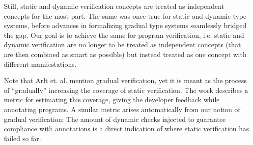 Still, static and dynamic verification concepts are treated as independent concepts for the most part.
The same was once true for static and dynamic type systems, before advances in formalizing gradual type systems seamlessly bridged the gap.
Our goal is to achieve the same for program verification, i.e. static and dynamic verification are no longer to be treated as independent concepts (that are then combined as smart as possible) but instead treated as one concept with different manifestations.

Note that Arlt et. al. \cite{arlt2014gradual} mention gradual verification, yet it is meant as the process of “gradually” increasing the coverage of static verification.
The work describes a metric for estimating this coverage, giving the developer feedback while annotating programs.
A similar metric arises automatically from our notion of gradual verification: The amount of dynamic checks injected to guarantee compliance with annotations is a direct indication of where static verification has failed so far.
